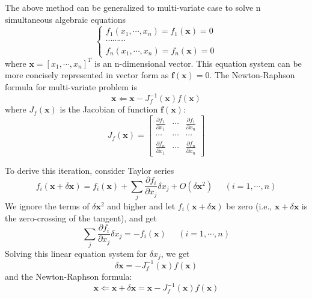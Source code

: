 The above method can be generalized to multi-variate case to solve n simultaneous
algebraic equations
\[ \left\{ \begin{array}{c} f_1(x_1,\cdots,x_n)=f_1({\mathbf x})=0	\\
		\cdots \cdots \cdots	\\
		f_n(x_1,\cdots,x_n)=f_n({\mathbf x})=0	\end{array} \right.	\]
where ${\mathbf x}=[x_1,\cdots,x_n]^T$ is an n-dimensional vector. This equation
system can be more concisely represented in vector form as
${\mathbf f}({\mathbf x})=0$. The Newton-Raphson formula for multi-variate
problem is
\[ {\mathbf x} \Leftarrow {\mathbf x}-J_f^{-1}({\mathbf x}) f({\mathbf x}) \]
where $J_f({\mathbf x})$ is the Jacobian of function ${\mathbf f}({\mathbf x})$:
\[	J_f( {\mathbf x})=\left[ \begin{array}{ccc}
\frac{\partial f_1}{\partial x_1} & \cdots & \frac{\partial f_1}{\partial x_n} \\
	\cdots	& \cdots & \cdots 	\\
\frac{\partial f_n}{\partial x_1} & \cdots & \frac{\partial f_n}{\partial x_n}
	\end{array}	\right]	\]

To derive this iteration, consider Taylor series
\[	f_i( {\mathbf x}+\delta {\mathbf x})=
	f_i( {\mathbf x}) +\sum_j \frac{\partial f_i}{\partial x_j} \delta x_j
	+O(\delta {\mathbf x}^2)\;\;\;\;\;(i=1,\cdots,n)
\]
We ignore the terms of $\delta {\mathbf x}^2$ and higher and let
$f_i( {\mathbf x}+\delta {\mathbf x})$ be zero (i.e., ${\mathbf x}+\delta {\mathbf x}$
is the zero-crossing of the tangent),  and get
\[	\sum_j \frac{\partial f_i}{\partial x_j} \delta x_j=-f_i( {\mathbf x})
	\;\;\;\;\;(i=1,\cdots,n) \]
Solving this linear equation system for $\delta x_j$, we get
\[ \delta {\mathbf x}=-J_f^{-1}({\mathbf x}) f({\mathbf x}) \]
and the Newton-Raphson formula:
\[ {\mathbf x} \Leftarrow {\mathbf x}+\delta {\mathbf x}=
{\mathbf x}-J_f^{-1}({\mathbf x}) f({\mathbf x}) \]



